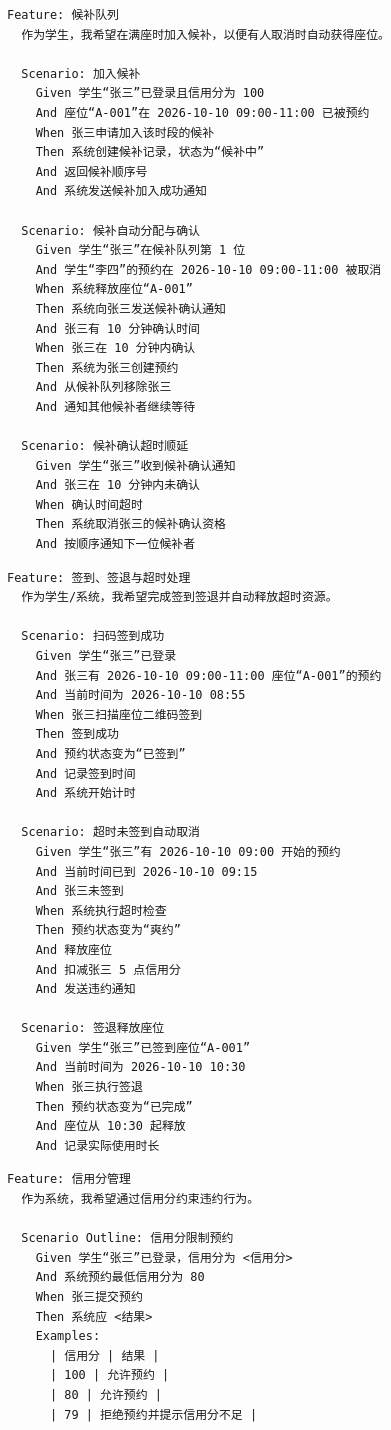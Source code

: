 \documentclass[11pt,a4paper]{article}
\begin{document}
\begin{framed}
\begin{verbatim}
Feature: 候补队列
  作为学生，我希望在满座时加入候补，以便有人取消时自动获得座位。

  Scenario: 加入候补
    Given 学生“张三”已登录且信用分为 100
    And 座位“A-001”在 2026-10-10 09:00-11:00 已被预约
    When 张三申请加入该时段的候补
    Then 系统创建候补记录，状态为“候补中”
    And 返回候补顺序号
    And 系统发送候补加入成功通知

  Scenario: 候补自动分配与确认
    Given 学生“张三”在候补队列第 1 位
    And 学生“李四”的预约在 2026-10-10 09:00-11:00 被取消
    When 系统释放座位“A-001”
    Then 系统向张三发送候补确认通知
    And 张三有 10 分钟确认时间
    When 张三在 10 分钟内确认
    Then 系统为张三创建预约
    And 从候补队列移除张三
    And 通知其他候补者继续等待

  Scenario: 候补确认超时顺延
    Given 学生“张三”收到候补确认通知
    And 张三在 10 分钟内未确认
    When 确认时间超时
    Then 系统取消张三的候补确认资格
    And 按顺序通知下一位候补者
\end{verbatim}
\end{framed}

\begin{framed}
\begin{verbatim}
Feature: 签到、签退与超时处理
  作为学生/系统，我希望完成签到签退并自动释放超时资源。

  Scenario: 扫码签到成功
    Given 学生“张三”已登录
    And 张三有 2026-10-10 09:00-11:00 座位“A-001”的预约
    And 当前时间为 2026-10-10 08:55
    When 张三扫描座位二维码签到
    Then 签到成功
    And 预约状态变为“已签到”
    And 记录签到时间
    And 系统开始计时

  Scenario: 超时未签到自动取消
    Given 学生“张三”有 2026-10-10 09:00 开始的预约
    And 当前时间已到 2026-10-10 09:15
    And 张三未签到
    When 系统执行超时检查
    Then 预约状态变为“爽约”
    And 释放座位
    And 扣减张三 5 点信用分
    And 发送违约通知

  Scenario: 签退释放座位
    Given 学生“张三”已签到座位“A-001”
    And 当前时间为 2026-10-10 10:30
    When 张三执行签退
    Then 预约状态变为“已完成”
    And 座位从 10:30 起释放
    And 记录实际使用时长
\end{verbatim}
\end{framed}

\begin{framed}
\begin{verbatim}
Feature: 信用分管理
  作为系统，我希望通过信用分约束违约行为。

  Scenario Outline: 信用分限制预约
    Given 学生“张三”已登录，信用分为 <信用分>
    And 系统预约最低信用分为 80
    When 张三提交预约
    Then 系统应 <结果>
    Examples:
      | 信用分 | 结果 |
      | 100 | 允许预约 |
      | 80 | 允许预约 |
      | 79 | 拒绝预约并提示信用分不足 |
\end{verbatim}
\end{framed}
\end{document}
